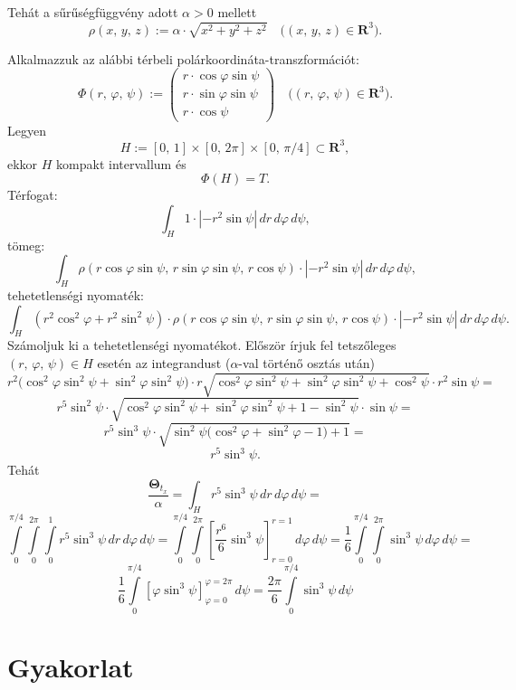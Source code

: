 \documentclass{article}
\newcommand{\R}{\mathbf{R}}
\begin{document}
	Tehát a sűrűségfüggvény adott $\alpha > 0$ mellett
	\[
		\rho(x, \, y, \, z) := \alpha \cdot \sqrt{x^2 + y^2 + z^2} \quad \big( (x, \, y, \, z) \in \R^3\big).
	\]

	Alkalmazzuk az alábbi térbeli polárkoordináta-transzformációt:
	\[
		\Phi(r, \, \varphi, \, \psi) := \begin{pmatrix}
			r \cdot \cos \varphi \sin \psi \\
			r \cdot \sin \varphi \sin \psi \\
			r \cdot \cos \psi
		\end{pmatrix} \quad \big( (r, \, \varphi, \, \psi) \in \R^3\big).
	\]
	Legyen
	\[
		H := [0, \, 1] \times [0, \, 2 \pi] \times [0, \, \pi / 4] \subset \R^3,
	\]
	ekkor $H$ kompakt intervallum és
	\[
		\Phi(H) = T.
	\]
	Térfogat:
	\[
		\int_H 1 \cdot |-r^2 \sin \psi| \, dr \, d\varphi \, d\psi,
	\]
	tömeg:
	\[
		\int_H \rho(r \cos \varphi \sin \psi, \, r \sin \varphi \sin \psi, \, r \cos \psi) \cdot |-r^2 \sin \psi| \, dr \, d\varphi \, d\psi,
	\]
	tehetetlenségi nyomaték:
	\[
		\int_H (r^2 \cos^2\varphi + r^2 \sin^2 \psi) \cdot \rho(r \cos \varphi \sin \psi, \, r \sin \varphi \sin \psi, \, r \cos \psi) \cdot |-r^2 \sin \psi| \, dr \, d\varphi \, d\psi.
	\]
	Számoljuk ki a tehetetlenségi nyomatékot. Először írjuk fel tetszőleges $(r, \, \varphi, \, \psi) \in H$ esetén az integrandust ($\alpha$-val történő osztás után)
	\[
		r^2 \big( \cos^2 \varphi \sin^2 \psi + \sin^2 \varphi \sin^2 \psi \big) \cdot r \sqrt{\cos^2 \varphi \sin^2 \psi + \sin^2 \varphi \sin^2 \psi + \cos^2 \psi} \cdot r^2 \sin \psi =
	\]
	\[
		r^5 \sin^2 \psi \cdot \sqrt{\cos^2 \varphi \sin^2 \psi + \sin^2 \varphi \sin^2 \psi + 1 - \sin^2 \psi} \cdot \sin \psi =
	\]
	\[
		r^5 \sin^3 \psi \cdot \sqrt{ \sin^2 \psi \big( \cos^2 \varphi + \sin^2 \varphi - 1 \big) + 1} =
	\]
	\[
		r^5 \sin^3 \psi.
	\]
	Tehát
	\[
		\frac{\mathbf{\Theta}_{t_x}}{\alpha} = \int_H r^5 \sin^3 \psi \, dr \, d\varphi \, d \psi =
	\]
	\[
		\int\limits_0^{\pi / 4} \int\limits_0^{2 \pi} \int \limits_0^{1} r^5 \sin^3 \psi \, dr \, d\varphi \, d\psi = \int\limits_0^{\pi / 4} \int\limits_0^{2 \pi} \left[ \frac{r^6}{6} \sin^3 \psi \right]_{r=0}^{r=1} \, d\varphi \, d\psi = \frac{1}{6} \int\limits_0^{\pi / 4} \int\limits_0^{2 \pi} \sin^3 \psi \, d\varphi \, d\psi =
	\]
	\[
		\frac{1}{6} \int\limits_0^{\pi / 4} [\varphi \sin^3\psi]_{\varphi=0}^{\varphi=2\pi} \, d\psi = \frac{2 \pi}{6} \int\limits_0^{\pi / 4} \sin^3\psi \, d\psi
	\]

	\newpage
	\section{Gyakorlat}
\end{document}
